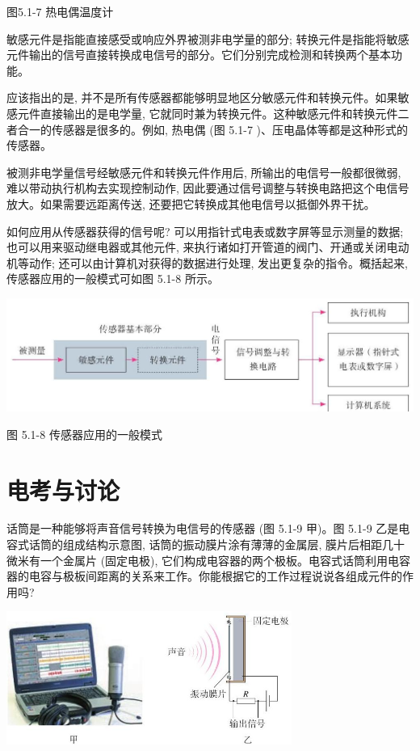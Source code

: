 \documentclass[10pt]{article}
\begin{document}
图5.1-7 热电偶温度计

敏感元件是指能直接感受或响应外界被测非电学量的部分; 转换元件是指能将敏感元件输出的信号直接转换成电信号的部分。它们分别完成检测和转换两个基本功能。

应该指出的是, 并不是所有传感器都能够明显地区分敏感元件和转换元件。如果敏感元件直接输出的是电学量, 它就同时兼为转换元件。这种敏感元件和转换元件二者合一的传感器是很多的。例如, 热电偶 (图 5.1-7 )、压电晶体等都是这种形式的传感器。

被测非电学量信号经敏感元件和转换元件作用后, 所输出的电信号一般都很微弱, 难以带动执行机构去实现控制动作, 因此要通过信号调整与转换电路把这个电信号放大。如果需要远距离传送, 还要把它转换成其他电信号以抵御外界干扰。

如何应用从传感器获得的信号呢? 可以用指针式电表或数字屏等显示测量的数据; 也可以用来驱动继电器或其他元件, 来执行诸如打开管道的阀门、开通或关闭电动机等动作; 还可以由计算机对获得的数据进行处理, 发出更复杂的指令。概括起来, 传感器应用的一般模式可如图 5.1-8 所示。

\begin{center}
\includegraphics[max width=1.0\textwidth]{images/01910e72-c5b7-7ed5-a6d4-fb3a5faefc32_99_319859.jpg}
\end{center}

图 5.1-8 传感器应用的一般模式

\section*{电考与讨论}

话筒是一种能够将声音信号转换为电信号的传感器 (图 5.1-9 甲)。图 5.1-9 乙是电容式话筒的组成结构示意图, 话筒的振动膜片涂有薄薄的金属层, 膜片后相距几十微米有一个金属片 (固定电极), 它们构成电容器的两个极板。电容式话筒利用电容器的电容与极板间距离的关系来工作。你能根据它的工作过程说说各组成元件的作用吗?

\begin{center}
\includegraphics[max width=0.7\textwidth]{images/01910e72-c5b7-7ed5-a6d4-fb3a5faefc32_100_239042.jpg}
\end{center}
\end{document}
